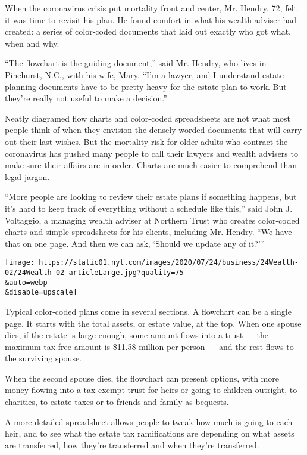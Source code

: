 When the coronavirus crisis put mortality front and center, Mr. Hendry,
72, felt it was time to revisit his plan. He found comfort in what his
wealth adviser had created: a series of color-coded documents that laid
out exactly who got what, when and why.

``The flowchart is the guiding document,'' said Mr. Hendry, who lives in
Pinehurst, N.C., with his wife, Mary. ``I'm a lawyer, and I understand
estate planning documents have to be pretty heavy for the estate plan to
work. But they're really not useful to make a decision.''

Neatly diagramed flow charts and color-coded spreadsheets are not what
most people think of when they envision the densely worded documents
that will carry out their last wishes. But the mortality risk for older
adults who contract the coronavirus has pushed many people to call their
lawyers and wealth advisers to make sure their affairs are in order.
Charts are much easier to comprehend than legal jargon.

``More people are looking to review their estate plans if something
happens, but it's hard to keep track of everything without a schedule
like this,'' said John J. Voltaggio, a managing wealth adviser at
Northern Trust who creates color-coded charts and simple spreadsheets
for his clients, including Mr. Hendry. ``We have that on one page. And
then we can ask, `Should we update any of it?'''

\texttt{[image: https://static01.nyt.com/images/2020/07/24/business/24Wealth-02/24Wealth-02-articleLarge.jpg?quality=75\\\&auto=webp\\\&disable=upscale]}

Typical color-coded plans come in several sections. A flowchart can be a
single page. It starts with the total assets, or estate value, at the
top. When one spouse dies, if the estate is large enough, some amount
flows into a trust --- the maximum tax-free amount is \$11.58 million
per person --- and the rest flows to the surviving spouse.

When the second spouse dies, the flowchart can present options, with
more money flowing into a tax-exempt trust for heirs or going to
children outright, to charities, to estate taxes or to friends and
family as bequests.

A more detailed spreadsheet allows people to tweak how much is going to
each heir, and to see what the estate tax ramifications are depending on
what assets are transferred, how they're transferred and when they're
transferred.

